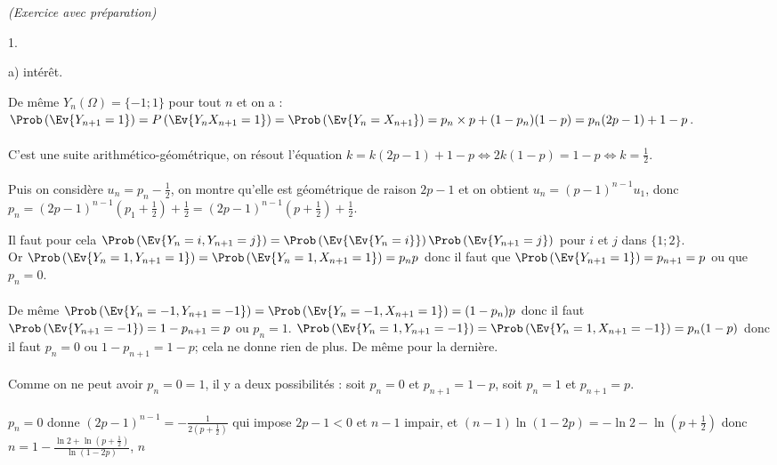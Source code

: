 \documentclass[11pt]{article}%
\begin{document}
\begin{exercice}{\it (Exercice avec préparation)}
\begin{noliste}{1.}
\begin{noliste}{a)}
intérêt. \\
 \item De même $Y_{n} ( \Omega) = \{-1 ; 1\}$ pour tout $n$ et on a :
\\
 $\Prob\left(\Ev{Y_{n + 1} = 1}\right) = P \left(\Ev{Y_{n} X_{n + 1} =
1}\right) = \Prob\left(\Ev{Y_{n} = X_{n + 1}}\right) = p_{n} \times p +
(1-p_{n}) (1-p) = p_{n} (2p -1) + 1 - p$. \\
\\
 C'est une suite arithmético-géométrique, on résout l'équation $k = k
(2p-1) + 1-p \Leftrightarrow 2 k (1-p) = 1-p \Leftrightarrow k =
\frac{1}{2}$. \\
\\
 Puis on considère $u_{n} = p_{n} - \frac{1}{2}$, on montre qu'elle est
géométrique de raison $2p-1$ et on obtient $u_{n} = (p-1)^{n-1} u_{1}$,
donc $p_{n} = (2p-1)^{n-1} \left( p_{1} + \frac{1}{2} \right) +
\frac{1}{2} = (2p-1)^{n-1} \left( p + \frac{1}{2} \right) +
\frac{1}{2}$. \\
 \item Il faut pour cela $\Prob\left(\Ev{Y_{n} = i, Y_{n + 1} =
j}\right) = \Prob\left(\Ev{\Ev{Y_{n} = i}}\right) \Prob\left(\Ev{ Y_{n
+ 1} = j}\right)$ pour $i$ et $j$ dans $\{ 1 ; 2\}$. \\
 Or $\Prob\left(\Ev{Y_{n} = 1, Y_{n + 1} = 1}\right) = \Prob\left(\Ev{
Y_{n} = 1, X_{n + 1} = 1 }\right) = p_{n} p$ donc il faut que
$\Prob\left(\Ev{ Y_{n + 1} = 1}\right) = p_{n + 1} = p$ ou que $p_{n} =
0$. \\
\\
 De même $\Prob\left(\Ev{Y_{n} = -1, Y_{n + 1} = -1}\right) =
\Prob\left(\Ev{Y_{n} = -1, X_{n + 1} = 1}\right) = (1-p_{n}) p$ donc il
faut $\Prob\left(\Ev{Y_{n + 1} = -1}\right) = 1 - p_{n + 1} = p$ ou
$p_{n} = 1$.
 $\Prob\left(\Ev{Y_{n} = 1, Y_{n + 1} = -1}\right) =
\Prob\left(\Ev{Y_{n} = 1, X_{n + 1} = -1}\right) = p_{n} (1-p)$ donc il
faut $p_{n} = 0$ ou $1 - p_{n + 1} = 1-p$; cela ne donne rien de plus.
De même pour la dernière. \\
\\
 Comme on ne peut avoir $p_{n} = 0 = 1$, il y a deux possibilités :
soit $p_{n} = 0$ et $p_{n + 1} = 1-p$, soit $p_{n} = 1$ et $p_{n + 1} =
p$. \\
\\
 $p_{n} = 0$ donne $(2p-1)^{n-1} = - \frac{1}{2 \left( p + \frac{1}{2}
\right)} $ qui impose $2p - 1 < 0$ et $n-1$ impair, et $(n-1) \ln
(1-2p) = - \ln 2 - \ln \left( p + \frac{1}{2} \right)$ donc $n = 1 -
\frac{ \ln 2 + \ln \left( p + \frac{1}{2} \right)}{ \ln (1-2p)}$, $n$

\end{noliste}
\end{noliste}
\end{exercice}
\end{document}
